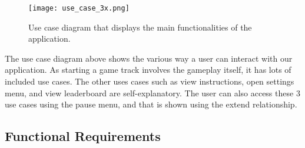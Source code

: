 \documentclass[12pt,letterpaper]{article}
\begin{document}
\begin{figure}[h]
    \centering
    \texttt{[image: use\_case\_3x.png]}
    \caption{Use case diagram that displays the main functionalities of the application.}
\end{figure}

The use case diagram above shows the various way a user can interact with our application. As starting a game track involves the gameplay itself, it has lots of included use cases. The other uses cases such as view instructions, open settings menu, and view leaderboard are self-explanatory. The user can also access these 3 use cases using the pause menu, and that is shown using the extend relationship.


\subsection{Functional Requirements}
\end{document}
